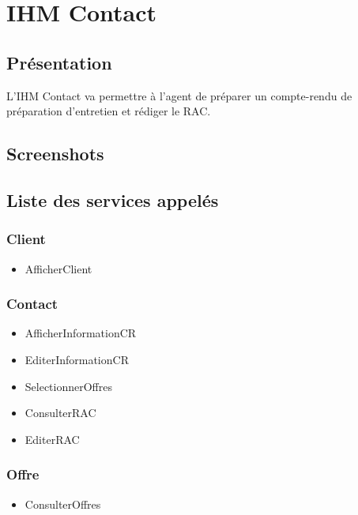 \section{IHM Contact}

\subsection{Présentation}

L'IHM Contact va permettre à l'agent de préparer un compte-rendu de préparation
d'entretien et rédiger le RAC.

\subsection{Screenshots}

\subsection{Liste des services appelés}

\subsubsection{Client}
\begin{itemize}
\item AfficherClient
\end{itemize}

\subsubsection{Contact}
\begin{itemize}
\item AfficherInformationCR
\item EditerInformationCR
\item SelectionnerOffres
\item ConsulterRAC
\item EditerRAC
\end{itemize}

\subsubsection{Offre}
\begin{itemize}
\item ConsulterOffres
\end{itemize}


